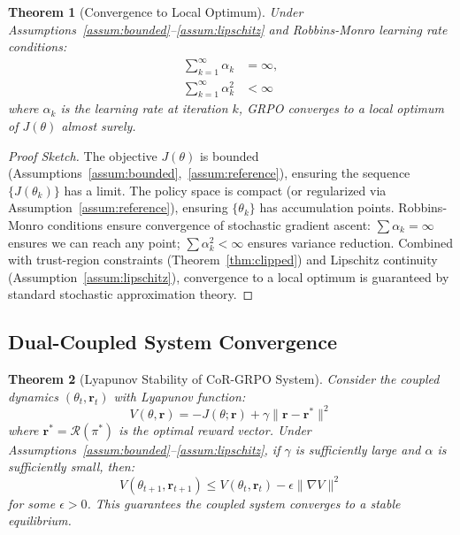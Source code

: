 \documentclass{article}
\theoremstyle{plain}
\newtheorem{theorem}{Theorem}[section]
\theoremstyle{definition}
\theoremstyle{remark}
\begin{document}
\begin{theorem}[Convergence to Local Optimum]
\label{thm:convergence}
Under Assumptions~\ref{assum:bounded}--\ref{assum:lipschitz} and Robbins-Monro learning rate conditions:
\begin{align}
\sum_{k=1}^{\infty} \alpha_k &= \infty, \\
\sum_{k=1}^{\infty} \alpha_k^2 &< \infty
\end{align}
where $\alpha_k$ is the learning rate at iteration $k$, GRPO converges to a local optimum of $J(\theta)$ almost surely.
\end{theorem}

\begin{proof}[Proof Sketch]
The objective $J(\theta)$ is bounded (Assumptions~\ref{assum:bounded},~\ref{assum:reference}), ensuring the sequence $\{J(\theta_k)\}$ has a limit. The policy space is compact (or regularized via Assumption~\ref{assum:reference}), ensuring $\{\theta_k\}$ has accumulation points. Robbins-Monro conditions ensure convergence of stochastic gradient ascent: $\sum \alpha_k = \infty$ ensures we can reach any point; $\sum \alpha_k^2 < \infty$ ensures variance reduction. Combined with trust-region constraints (Theorem~\ref{thm:clipped}) and Lipschitz continuity (Assumption~\ref{assum:lipschitz}), convergence to a local optimum is guaranteed by standard stochastic approximation theory.
\end{proof}

\subsection{Dual-Coupled System Convergence}

\begin{theorem}[Lyapunov Stability of CoR-GRPO System]
\label{thm:lyapunov}
Consider the coupled dynamics $(\theta_t, \mathbf{r}_t)$ with Lyapunov function:
\begin{equation}
V(\theta, \mathbf{r}) = -J(\theta; \mathbf{r}) + \gamma \|\mathbf{r} - \mathbf{r}^*\|^2
\end{equation}
where $\mathbf{r}^* = \mathcal{R}(\pi^*)$ is the optimal reward vector. Under Assumptions~\ref{assum:bounded}--\ref{assum:lipschitz}, if $\gamma$ is sufficiently large and $\alpha$ is sufficiently small, then:
\begin{equation}
V(\theta_{t+1}, \mathbf{r}_{t+1}) \leq V(\theta_t, \mathbf{r}_t) - \epsilon \|\nabla V\|^2
\end{equation}
for some $\epsilon > 0$. This guarantees the coupled system converges to a stable equilibrium.
\end{theorem}
\end{document}
